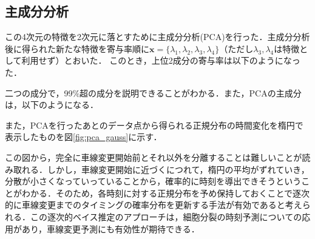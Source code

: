 \subsection{主成分分析}
この4次元の特徴を2次元に落とすために主成分分析(PCA)を行った．主成分分析後に得られた新たな特徴を寄与率順に$\mathbf{x}=\{\lambda_1,\lambda_2,\lambda_3,\lambda_4\}$（ただし$\lambda_3,\lambda_4$は特徴として利用せず）とおいた．
このとき，上位2成分の寄与率は以下のようになった．

二つの成分で，99\%超の成分を説明できることがわかる．また，PCAの主成分は，以下のようになる．

また，PCAを行ったあとのデータ点から得られる正規分布の時間変化を楕円で表示したものを図\ref{fig:pca_gauss}に示す．

この図から，完全に車線変更開始前とそれ以外を分離することは難しいことが読み取れる．しかし，車線変更開始に近づくにつれて，楕円の平均がずれていき，分散が小さくなっていっていることから，確率的に時刻を導出できそうということがわかる．そのため，各時刻に対する正規分布を予め保持しておくことで逐次的に車線変更までのタイミングの確率分布を更新する手法が有効であると考えられる．この逐次的ベイス推定のアプローチは，細胞分裂の時刻予測についての応用\cite{Kozawa}があり，車線変更予測にも有効性が期待できる．
